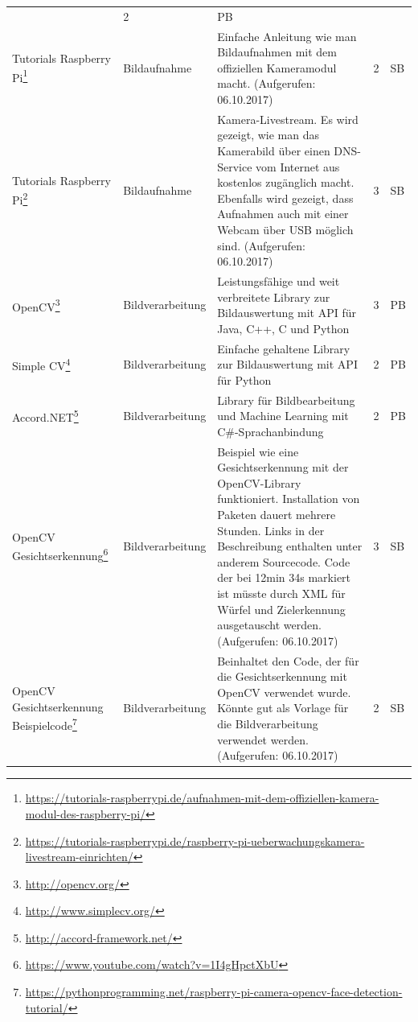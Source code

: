 \documentclass[a4paper,11pt]{scrartcl}
\begin{document}
\begin{landscape}
{\begin{longtable}{|p{4cm}|p{4cm}|p{12cm}|l|l|}
& 2 
& PB \\
Tutorials Raspberry Pi\footnote{\url{https://tutorials-raspberrypi.de/aufnahmen-mit-dem-offiziellen-kamera-modul-des-raspberry-pi/}}
& Bildaufnahme
& Einfache Anleitung wie man Bildaufnahmen mit dem offiziellen Kameramodul macht. (Aufgerufen: 06.10.2017)
& 2 
& SB \\
Tutorials Raspberry Pi\footnote{\url{https://tutorials-raspberrypi.de/raspberry-pi-ueberwachungskamera-livestream-einrichten/}}
& Bildaufnahme
& Kamera-Livestream. Es wird gezeigt, wie man das Kamerabild über einen DNS-Service vom Internet aus kostenlos zugänglich macht. Ebenfalls wird gezeigt, dass Aufnahmen auch mit einer Webcam über USB möglich sind. (Aufgerufen: 06.10.2017)
& 3 
& SB \\
OpenCV\footnote{\url{http://opencv.org/}}
& Bildverarbeitung
& Leistungsfähige und weit verbreitete Library zur Bildauswertung mit API für Java, C++, C und Python
& 3 
& PB \\
Simple CV\footnote{\url{http://www.simplecv.org/}}
& Bildverarbeitung
& Einfache gehaltene Library zur Bildauswertung mit API für Python
& 2 
& PB \\
Accord.NET\footnote{\url{http://accord-framework.net/}}
& Bildverarbeitung
& Library für Bildbearbeitung und Machine Learning mit C\#-Sprachanbindung
& 2 
& PB \\
OpenCV Gesichtserkennung\footnote{\url{https://www.youtube.com/watch?v=1I4gHpctXbU}}
& Bildverarbeitung
& Beispiel wie eine Gesichtserkennung mit der OpenCV-Library funktioniert. Installation von Paketen dauert mehrere Stunden. Links in der Beschreibung enthalten unter anderem Sourcecode. Code der bei 12min 34s markiert ist müsste durch XML für Würfel und Zielerkennung ausgetauscht werden. (Aufgerufen: 06.10.2017)
& 3 
& SB \\
OpenCV Gesichtserkennung Beispielcode\footnote{\url{https://pythonprogramming.net/raspberry-pi-camera-opencv-face-detection-tutorial/}}
& Bildverarbeitung
& Beinhaltet den Code, der für die Gesichtserkennung mit OpenCV verwendet wurde. Könnte gut als Vorlage für die Bildverarbeitung verwendet werden. (Aufgerufen: 06.10.2017)
& 2 
& SB \\

\hline
\end{longtable}
}
\end{landscape}
\end{document}
